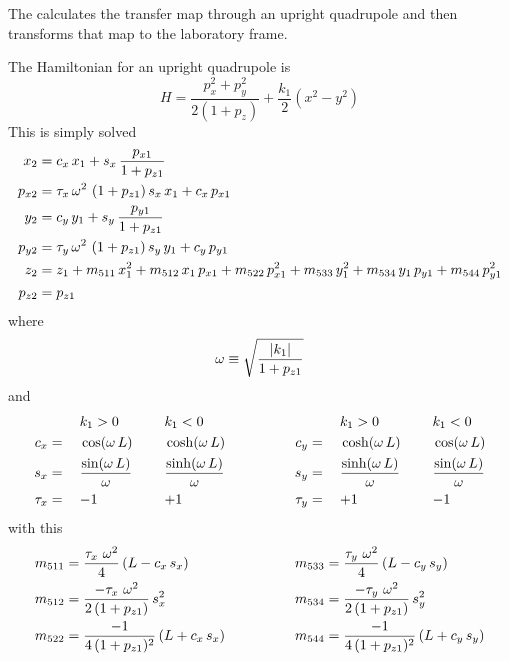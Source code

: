 The  calculates the transfer map through an upright
quadrupole and then transforms that map to the laboratory frame.

The Hamiltonian for an upright quadrupole is
\begin{equation}
  H = \frac{p_x^2 + p_y^2}{2 (1 + p_z)} + \frac{k_1}{2} (x^2 - y^2)
\end{equation}
This is simply solved
\begin{align}
  x_2    &= c_x \, x_1 + s_x \, \frac{p_{x1}}{1 + p_{z1}} \nonumber \\
  p_{x2} &= \tau_x \, \omega^2 \, \, (1 + p_{z1}) \, s_x \, x_1 + c_x \, p_{x1} \nonumber \\
  y_2    &= c_y \, y_1 + s_y \, \frac{p_{y1}}{1 + p_{z1}} \nonumber \\
  p_{y2} &= \tau_y \, \omega^2 \, \, (1 + p_{z1}) \, s_y \, y_1 + c_y \, p_{y1} \\
  z_2    &= z_1 + m_{511} \, x_1^2 + m_{512} \, x_1 \, p_{x1} + m_{522} \, p_{x1}^2 + 
                   m_{533} \, y_1^2 + m_{534} \, y_1 \, p_{y1} + m_{544} \, p_{y1}^2 \nonumber \\
  p_{z2} &= p_{z1} \nonumber
\end{align}
where 
\begin{equation}
  \omega \equiv \sqrt{\frac{|k_1|}{1 + p_{z1}}}
\end{equation}
and
\begin{alignat}{6}
         &\hspace*{3ex}  && k_1 > 0          &\hspace*{3ex}& k_1 < 0 & \qquad \qquad
         &\hspace*{3ex}  && k_1 > 0          &\hspace*{3ex}& k_1 < 0 \nonumber \\
     c_x &=   && \cos  (\omega \, L) && \cosh (\omega \, L) & \qquad \qquad
     c_y &=   && \cosh (\omega \, L) && \cos  (\omega \, L) \nonumber \\
     s_x &=   && \frac{\sin  (\omega \, L)}{\omega} && \frac{\sinh (\omega \, L)}{\omega} & \qquad \qquad
     s_y &=   && \frac{\sinh (\omega \, L)}{\omega} && \frac{\sin  (\omega \, L)}{\omega} \\
  \tau_x &=   && {-}1             && {+}1             & \qquad \qquad
  \tau_y &=   && {+}1             && {-}1             \nonumber
\end{alignat}
with this
\begin{alignat}{2}
  m_{511} &= \frac{\tau_x \,\, \omega^2}{4} \, (L - c_x \, s_x) & \qquad \qquad
  m_{533} &= \frac{\tau_y \,\, \omega^2}{4} \, (L - c_y \, s_y) \nonumber \\
  m_{512} &= \frac{-\tau_x \,\, \omega^2}{2 \, (1 + p_{z1})} \, s_x^2 & \qquad \qquad
  m_{534} &= \frac{-\tau_y \,\, \omega^2}{2 \, (1 + p_{z1})} \, s_y^2 \\
  m_{522} &= \frac{-1}{4 \, (1 + p_{z1})^2} \, (L + c_x \, s_x) & \qquad \qquad
  m_{544} &= \frac{-1}{4 \, (1 + p_{z1})^2} \, (L + c_y \, s_y) \nonumber
\end{alignat}

